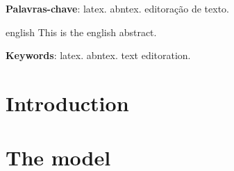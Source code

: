 \begin{dedicatoria}
   \vspace*{\fill}
   \centering
   \noindent
   \textit{} \vspace*{\fill}
\end{dedicatoria}
\begin{agradecimentos}

\end{agradecimentos}
\begin{epigrafe}
    \vspace*{\fill}
	\begin{flushright}
		\textit{}
	\end{flushright}
\end{epigrafe}
\setlength{\absparsep}{18pt} %
\begin{resumo}


 \textbf{Palavras-chave}: latex. abntex. editoração de texto.
\end{resumo}

\begin{resumo}[Abstract]
 \begin{otherlanguage*}{english}
   This is the english abstract.

   \vspace{\onelineskip}
 
   \noindent 
   \textbf{Keywords}: latex. abntex. text editoration.
 \end{otherlanguage*}
\end{resumo}
\listoffigures*
\cleardoublepage
\listoftables*
\cleardoublepage
\tableofcontents*
\cleardoublepage
\textual

\chapter{Introduction}


\chapter{The model}\label{cap_trabalho_academico}

